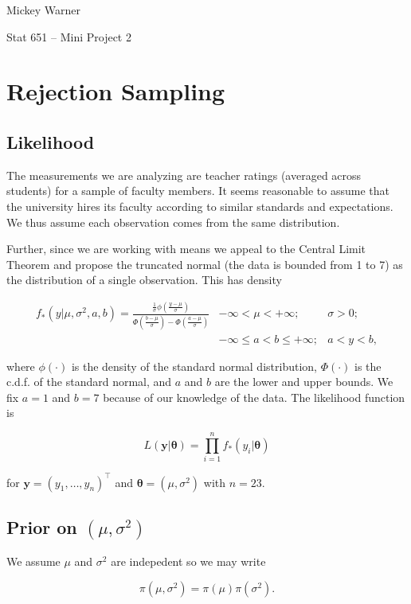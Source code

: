 \documentclass[12pt]{article}
\newcommand{\m}[1]{\mathbf{\bm{#1}}}
\begin{document}
\noindent Mickey Warner

\noindent Stat 651 -- Mini Project 2

\section{Rejection Sampling}

\subsection{Likelihood}

\noindent The measurements we are analyzing are teacher ratings (averaged across students) for a sample of faculty members. It seems reasonable to assume that the university hires its faculty according to similar standards and expectations. We thus assume each observation comes from the same distribution.
\bigskip

\noindent Further, since we are working with means we appeal to the Central Limit Theorem and propose the truncated normal (the data is bounded from 1 to 7) as the distribution of a single observation. This has density

\begin{eqnarray*}
f_*(y|\mu,\sigma^2,a,b) = \frac{\frac{1}{\sigma}\phi(\frac{y-\mu}{\sigma})}{\Phi(\frac{b-\mu}{\sigma})-\Phi(\frac{a-\mu}{\sigma})} & -\infty < \mu < +\infty; & \sigma > 0; \\
& -\infty \leq a < b \leq +\infty; & a < y < b,
\end{eqnarray*}

\noindent where $\phi(\cdot)$ is the density of the standard normal distribution, $\Phi(\cdot)$ is the c.d.f. of the standard normal, and $a$ and $b$ are the lower and upper bounds. We fix $a=1$ and $b=7$ because of our knowledge of the data. The likelihood function is

\[L(\m{y}|\m{\theta}) = \prod_{i=1}^n f_*(y_i|\m{\theta}) \]

\noindent for $\m{y}=(y_1,\ldots,y_n)^\top$ and $\m{\theta}=(\mu, \sigma^2)$ with $n=23$.

\subsection{Prior on $(\mu, \sigma^2)$}

\noindent We assume $\mu$ and $\sigma^2$ are indepedent so we may write

\[ \pi(\mu, \sigma^2) = \pi(\mu)\pi(\sigma^2). \]
\end{document}
